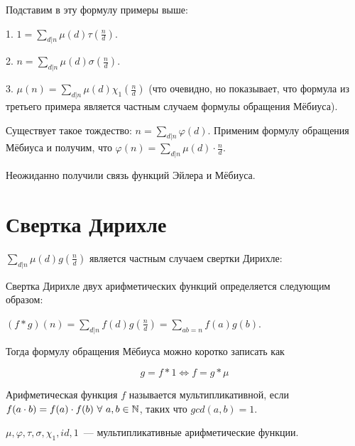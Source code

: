\begin{example}
    Подставим в эту формулу примеры выше:

    1. $1 = \sum \limits_{d | n} \mu(d) \tau \left ( \frac{n}{d} \right )$.
    
    2. $n = \sum \limits_{d | n} \mu(d) \sigma \left ( \frac{n}{d} \right )$.

    3. $\mu(n) = \sum \limits_{d | n} \mu(d) \chi_1 \left ( \frac{n}{d} \right )$ (что очевидно, но показывает, что формула из третьего примера является частным случаем формулы обращения Мёбиуса).
\end{example}

\begin{example}
    Существует такое тождество: $n = \sum \limits_{d | n} \varphi(d)$. Применим формулу обращения Мёбиуса и получим, что
    $\varphi(n) = \sum \limits_{d | n} \mu(d) \cdot \frac{n}{d}$.

    Неожиданно получили связь функций Эйлера и Мёбиуса.
\end{example}

\section{Свертка Дирихле}

$\sum \limits_{d | n} \mu(d) g \left ( \frac{n}{d} \right )$ является частным случаем свертки Дирихле:

\begin{definition}
    Свертка Дирихле двух арифметических функций определяется следующим образом:

    $(f * g)(n) = \sum \limits_{d | n} f(d) g \left ( \frac{n}{d} \right ) = \sum \limits_{ab = n} f(a) g(b)$.
\end{definition}

\begin{observation}
    Тогда формулу обращения Мёбиуса можно коротко записать как

    $$
    g = f * 1 \Leftrightarrow f = g * \mu
    $$
\end{observation}

\begin{definition}
    Арифметическая функция $f$ называется мультипликативной, если
    $f(a \cdot b) = f(a) \cdot f(b) \ \forall \ a, b \in \mathbb{N}$, таких что $gcd(a, b) = 1$.
\end{definition}

\begin{observation}
    $\mu, \varphi, \tau, \sigma, \chi_1, id, 1$~--- мультипликативные арифметические функции.
\end{observation}

